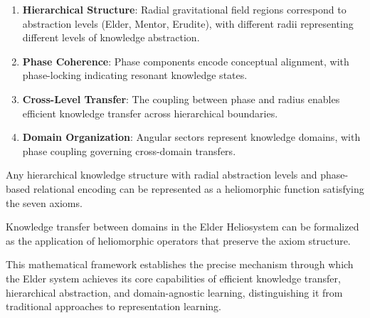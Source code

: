 \begin{enumerate}
    \item \textbf{Hierarchical Structure}: Radial gravitational field regions correspond to abstraction levels (Elder, Mentor, Erudite), with different radii representing different levels of knowledge abstraction.
    
    \item \textbf{Phase Coherence}: Phase components encode conceptual alignment, with phase-locking indicating resonant knowledge states.
    
    \item \textbf{Cross-Level Transfer}: The coupling between phase and radius enables efficient knowledge transfer across hierarchical boundaries.
    
    \item \textbf{Domain Organization}: Angular sectors represent knowledge domains, with phase coupling governing cross-domain transfers.
\end{enumerate}

\begin{theorem}
Any hierarchical knowledge structure with radial abstraction levels and phase-based relational encoding can be represented as a heliomorphic function satisfying the seven axioms.
\end{theorem}

\begin{corollary}
Knowledge transfer between domains in the Elder Heliosystem can be formalized as the application of heliomorphic operators that preserve the axiom structure.
\end{corollary}

This mathematical framework establishes the precise mechanism through which the Elder system achieves its core capabilities of efficient knowledge transfer, hierarchical abstraction, and domain-agnostic learning, distinguishing it from traditional approaches to representation learning.